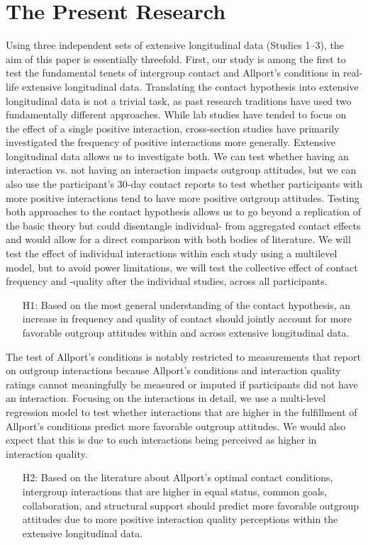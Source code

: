 \documentclass[man, 12pt, a4paper, mask]{apa7}
\theoremstyle{break}
\theoremstyle{plain}
\begin{document}
\section{The Present Research}
Using three independent sets of extensive longitudinal data (Studies 1–3), the aim of this paper is essentially threefold. First, our study is among the first to test the fundamental tenets of intergroup contact and Allport's conditions in real-life extensive longitudinal data. Translating the contact hypothesis into extensive longitudinal data is not a trivial task, as past research traditions have used two fundamentally different approaches. While lab studies have tended to focus on the effect of a single positive interaction, cross-section studies have primarily investigated the frequency of positive interactions more generally. Extensive longitudinal data allows us to investigate both. We can test whether having an interaction vs. not having an interaction impacts outgroup attitudes, but we can also use the participant's 30-day contact reports to test whether participants with more positive interactions tend to have more positive outgroup attitudes. Testing both approaches to the contact hypothesis allows us to go beyond a replication of the basic theory but could disentangle individual- from aggregated contact effects and would allow for a direct comparison with both bodies of literature. We will test the effect of individual interactions within each study using a multilevel model, but to avoid power limitations, we will test the collective effect of contact frequency and -quality after the individual studies, across all participants.
\begin{enumerate}[leftmargin=1.5\parindent]
    \item[H1:] Based on the most general understanding of the contact hypothesis, an increase in frequency and quality of contact should jointly account for more favorable outgroup attitudes within and across extensive longitudinal data.
\end{enumerate}

The test of Allport's conditions is notably restricted to measurements that report on outgroup interactions because Allport's conditions and interaction quality ratings cannot meaningfully be measured or imputed if participants did not have an interaction. Focusing on the interactions in detail, we use a multi-level regression model to test whether interactions that are higher in the fulfillment of Allport's conditions predict more favorable outgroup attitudes. We would also expect that this is due to such interactions being perceived as higher in interaction quality.
\begin{enumerate}[leftmargin=1.5\parindent]
    \item[H2:] Based on the literature about Allport’s optimal contact conditions, intergroup interactions that are higher in equal status, common goals, collaboration, and structural support should predict more favorable outgroup attitudes due to more positive interaction quality perceptions within the extensive longitudinal data.
\end{enumerate}
\end{document}
